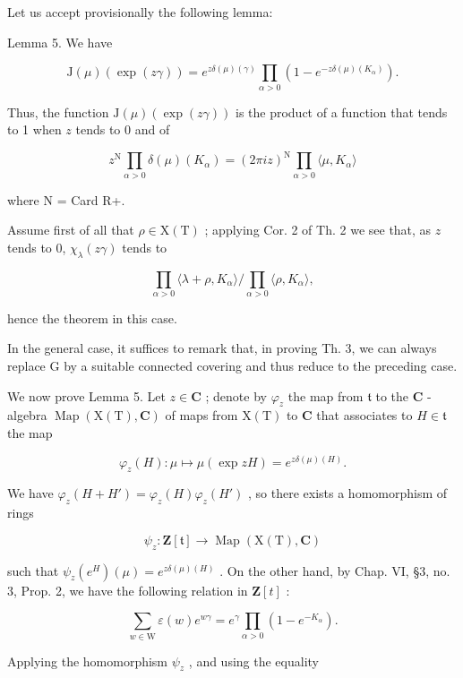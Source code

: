 Let us accept provisionally the following lemma:

Lemma 5. We have

\[
\mathrm{J} (\mu) (\exp (z \gamma)) = e ^ {z \delta (\mu) (\gamma)} \prod_ {\alpha > 0} (1 - e ^ {- z \delta (\mu) (K _ {\alpha})}).
\]

Thus, the function \(\mathrm{J}(\mu)(\exp (z\gamma))\) is the product of a function that tends to 1 when \(z\) tends to 0 and of

\[
z ^ {\mathrm{N}} \prod_ {\alpha > 0} \delta (\mu) (K _ {\alpha}) = (2 \pi i z) ^ {\mathrm{N}} \prod_ {\alpha > 0} \langle \mu , K _ {\alpha} \rangle
\]

where N = Card R+.

Assume first of all that \(\rho \in \mathrm{X(T)}\) ; applying Cor. 2 of Th. 2 we see that, as \(z\) tends to 0, \(\chi_{\lambda}(z\gamma)\) tends to

\[
\prod_ {\alpha > 0} \langle \lambda + \rho , K _ {\alpha} \rangle / \prod_ {\alpha > 0} \langle \rho , K _ {\alpha} \rangle ,
\]

hence the theorem in this case.

In the general case, it suffices to remark that, in proving Th. 3, we can always replace G by a suitable connected covering and thus reduce to the preceding case.

We now prove Lemma 5. Let \(z \in \mathbf{C}\) ; denote by \(\varphi_z\) the map from \(\mathfrak{t}\) to the \(\mathbf{C}\) -algebra \(\operatorname{Map}(\mathrm{X}(\mathrm{T}), \mathbf{C})\) of maps from \(\mathrm{X}(\mathrm{T})\) to \(\mathbf{C}\) that associates to \(H \in \mathfrak{t}\) the map

\[
\varphi_ {z} (H): \mu \mapsto \mu (\exp z H) = e ^ {z \delta (\mu) (H)}.
\]

We have \(\varphi_z(H + H') = \varphi_z(H)\varphi_z(H')\) , so there exists a homomorphism of rings

\[
\psi_ {z}: \mathbf {Z} [ \mathfrak {t} ] \to \operatorname{Map} (\mathrm{X} (\mathrm{T}), \mathbf {C})
\]

such that \(\psi_z(e^H)(\mu) = e^{z\delta (\mu)(H)}\) . On the other hand, by Chap. VI, §3, no. 3, Prop. 2, we have the following relation in \(\mathbf{Z}[t]\) :

\[
\sum_ {w \in \mathrm{W}} \varepsilon (w) e ^ {w \gamma} = e ^ {\gamma} \prod_ {\alpha > 0} (1 - e ^ {- K _ {\alpha}}).
\]

Applying the homomorphism \(\psi_z\) , and using the equality

